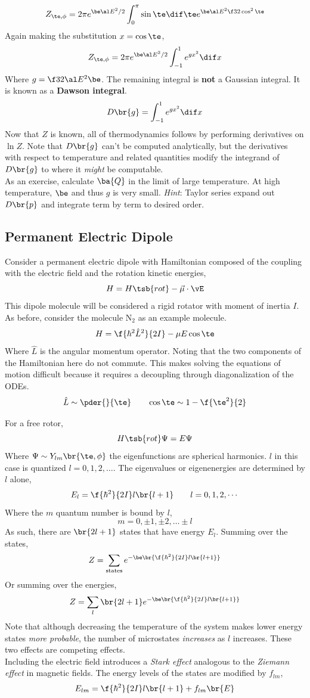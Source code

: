 \documentclass{article}
\begin{document}
\[ Z_{\te,\phi} = 2\pi e^{\be \al E^2 / 2} \int_{0}^{\pi} \sin \te \dif \te e^{\be \al E^2 \f32 \cos^2\te} \]
Again making the substitution $x = \cos \te$,
\[ Z_{\te,\phi} = 2\pi e^{\be \al E^2 / 2} \int_{-1}^{1} e^{g x^2} \dif x \]
Where $g = \f32 \al E^2 \be$. The remaining integral is \textbf{not} a Gaussian integral. It is known as a \textbf{Dawson integral}.
\[ D\br{g} = \int_{-1}^{1} e^{g x^2} \dif x \]
Now that $Z$ is known, all of thermodynamics follows by performing derivatives on $\ln Z$. Note that $D\br{g}$ can't be computed analytically, but the derivatives with respect to temperature and related quantities modify the integrand of $D\br{g}$ to where it \textit{might} be computable. \\

As an exercise, calculate $\ba{Q}$ in the limit of large temperature. At high temperature, $\be$ and thus $g$ is very small. \textit{Hint}: Taylor series expand out $D\br{p}$ and integrate term by term to desired order.

\subsection{Permanent Electric Dipole}

Consider a permanent electric dipole with Hamiltonian composed of the coupling with the electric field and the rotation kinetic energies,
\[ H = H\tsb{rot} - \vec{\mu} \cdot \vE \]
This dipole molecule will be considered a rigid rotator with moment of inertia $I$. As before, consider the molecule $\text{N}_2$ as an example molecule.
\[ H = \f{\hbar^2 \hat{L}^2}{2 I} - \mu E \cos \te \]
Where $\hat{L}$ is the angular momentum operator. Noting that the two components of the Hamiltonian here do not commute. This makes solving the equations of motion difficult because it requires a decoupling through diagonalization of the ODEs.
\[ \hat{L} \sim \pder{}{\te} \qquad \cos \te \sim 1 - \f{\te^2}{2} \]

For a free rotor,
\[ H\tsb{rot} \Psi = E \Psi \]
Where $\Psi \sim Y_{lm}\br{\te, \phi}$ the eigenfunctions are spherical harmonics. $l$ in this case is quantized $l = 0, 1, 2,\ldots$. The eigenvalues or eigenenergies are determined by $l$ alone,
\[ E_l = \f{\hbar^2}{2I}l\br{l+1} \qquad l = 0,1,2,\cdots \]
Where the $m$ quantum number is bound by $l$,
\[ m = 0, \pm 1, \pm 2, \ldots \pm l \]
As such, there are $\br{2l+1}$ states that have energy $E_l$. Summing over the states,
\[ Z = \sum_{\text{states}} e^{-\be \br{\f{\hbar^2}{2I}l\br{l+1}}} \]
Or summing over the energies,
\[ Z = \sum_{l} \br{2l + 1} e^{-\be \br{\f{\hbar^2}{2I}l\br{l+1}}} \]
Note that although decreasing the temperature of the system makes lower energy states \textit{more probable}, the number of microstates \textit{increases} as $l$ increases. These two effects are competing effects.\\
Including the electric field introduces a \textit{Stark effect} analogous to the \textit{Ziemann effect} in magnetic fields. The energy levels of the states are modified by $f_{lm}$,
\[ E_{lm} = \f{\hbar^2}{2I} l\br{l+1} + f_{lm}\br{E} \]
\end{document}
